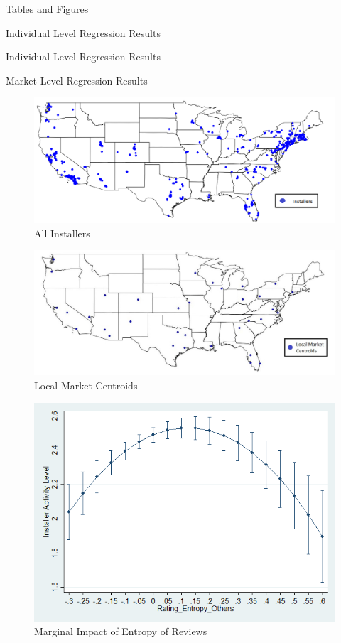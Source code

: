 \documentclass[mnsc,blindrev]{informs3} %
\begin{document}
\begin{APPENDIX}{Tables and Figures}
 \begin{table}[p]
 
 \caption{Individual Level Regression Results}
 \label{table_ind_level}
 \end{table}
 
 \begin{table}[p]
 
 \caption{Individual Level Regression Results}
 \end{table}

 \clearpage

 \begin{table}[p]
	
	\label{table_mkt_level}
	\caption{Market Level Regression Results}
\end{table}

\begin{figure}
	\centering
	\includegraphics[width=0.7\linewidth]{national_installers}
	\caption{All Installers}
	\label{fig:nationalinstallers}
\end{figure}

\begin{figure}
	\centering
	\includegraphics[width=0.7\linewidth]{markets}
	\caption{Local Market Centroids}
	\label{fig:markets}
\end{figure}

\begin{figure}
	\centering
	\includegraphics[width=0.7\linewidth]{marginsplot_entothers}
	\caption{Marginal Impact of Entropy of Reviews}
	\label{fig:markets}
\end{figure}  

\end{APPENDIX}
\end{document}
